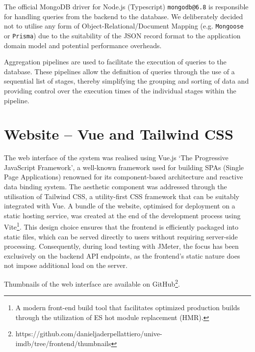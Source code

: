 The official MongoDB driver for Node.js (Typescript) \verb|mongodb@6.8| is responsible for handling queries from the backend to the database.
We deliberately decided not to utilise any form of Object-Relational/Document Mapping (e.g. \verb|Mongoose| or \verb|Prisma|) due to the suitability of the JSON record format to the application domain model and potential performance overheads.

Aggregation pipelines are used to facilitate the execution of queries to the database.
These pipelines allow the definition of queries through the use of a sequential list of stages, thereby simplifying the grouping and sorting of data and providing control over the execution times of the individual stages within the pipeline.

\section{Website -- Vue and Tailwind CSS}

The web interface of the system was realised using Vue.js `The Progressive JavaScript Framework', a well-known framework used for building SPAs (Single Page Applications) renowned for its component-based architecture and reactive data binding system.
The aesthetic component was addressed through the utilisation of Tailwind CSS, a utility-first CSS framework that can be suitably integrated with Vue.
A bundle of the website, optimised for deployment on a static hosting service, was created at the end of the development process using Vite\footnote[4]{A modern front-end build tool that facilitates optimized production builds through the utilization of ES hot module replacement (HMR).}.
This design choice ensures that the frontend is efficiently packaged into static files, which can be served directly to users without requiring server-side processing.
Consequently, during load testing with JMeter, the focus has been exclusively on the backend API endpoints, as the frontend's static nature does not impose additional load on the server.

Thumbnails of the web interface are available on GitHub\footnote[5]{https://github.com/danieljaderpellattiero/unive-imdb/tree/frontend/thumbnails}.
